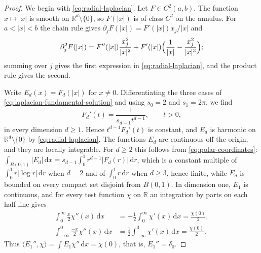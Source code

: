 \begin{proof}
We begin with \eqref{eq:radial-laplacian}. Let $F\in C^2(a,b)$. The function $x\mapsto|x|$ is smooth on $\mathbb R^d\setminus\{0\}$, so $F(|x|)$ is of class $C^2$ on the annulus. For $a<|x|<b$ the chain rule gives $\partial_jF(|x|)=F'(|x|)x_j/|x|$ and
\[
 \partial_j^2F(|x|)=F''(|x|)\frac{x_j^2}{|x|^2}+F'(|x|)\Bigl(\frac1{|x|}-\frac{x_j^2}{|x|^3}\Bigr);
\]
summing over $j$ gives the first expression in \eqref{eq:radial-laplacian}, and the product rule gives the second.

Write $E_d(x)=F_d(|x|)$ for $x\neq0$. Differentiating the three cases of \eqref{eq:laplacian-fundamental-solution} and using $s_0=2$ and $s_1=2\pi$, we find
\[
 F_d'(t)=\frac1{s_{d-1}t^{d-1}},\qquad t>0,
\]
in every dimension $d\geq1$. Hence $t^{d-1}F_d'(t)$ is constant, and $E_d$ is harmonic on $\mathbb R^d\setminus\{0\}$ by \eqref{eq:radial-laplacian}. The functions $E_d$ are continuous off the origin, and they are locally integrable. For $d\geq2$ this follows from \eqref{eq:polar-coordinates}: $\int_{B(0,1)}|E_d|\,\mathrm dx=s_{d-1}\int_0^1r^{d-1}|F_d(r)|\,\mathrm dr$, which is a constant multiple of $\int_0^1r|\log r|\,\mathrm dr$ when $d=2$ and of $\int_0^1r\,\mathrm dr$ when $d\geq3$, hence finite, while $E_d$ is bounded on every compact set disjoint from $B(0,1)$. In dimension one, $E_1$ is continuous, and for every test function $\chi$ on $\mathbb R$ an integration by parts on each half-line gives
\begin{align*}
 \int_0^\infty\frac x2\chi''(x)\,\mathrm dx&=-\frac12\int_0^\infty\chi'(x)\,\mathrm dx=\frac{\chi(0)}2,\\
 \int_{-\infty}^0\frac{-x}2\chi''(x)\,\mathrm dx&=\frac12\int_{-\infty}^0\chi'(x)\,\mathrm dx=\frac{\chi(0)}2.
\end{align*}
Thus $\langle E_1'',\chi\rangle=\int E_1\chi''\,\mathrm dx=\chi(0)$, that is, $E_1''=\delta_0$.


\end{proof}

